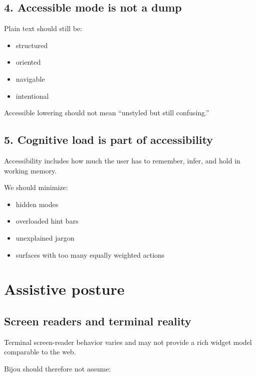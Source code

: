 \subsection{4. Accessible mode is not a dump}\label{record-032-accessible-mode-is-not-a-dump}

Plain text should still be:

\begin{itemize}
\tightlist
\item
  structured
\item
  oriented
\item
  navigable
\item
  intentional
\end{itemize}

Accessible lowering should not mean ``unstyled but still confusing.''

\subsection{5. Cognitive load is part of accessibility}\label{record-032-cognitive-load-is-part-of-accessibility}

Accessibility includes how much the user has to remember, infer, and hold in working memory.

We should minimize:

\begin{itemize}
\tightlist
\item
  hidden modes
\item
  overloaded hint bars
\item
  unexplained jargon
\item
  surfaces with too many equally weighted actions
\end{itemize}

\section{Assistive posture}\label{record-032-assistive-posture}

\subsection{Screen readers and terminal reality}\label{record-032-screen-readers-and-terminal-reality}

Terminal screen-reader behavior varies and may not provide a rich widget model comparable to the web.

Bijou should therefore not assume:

